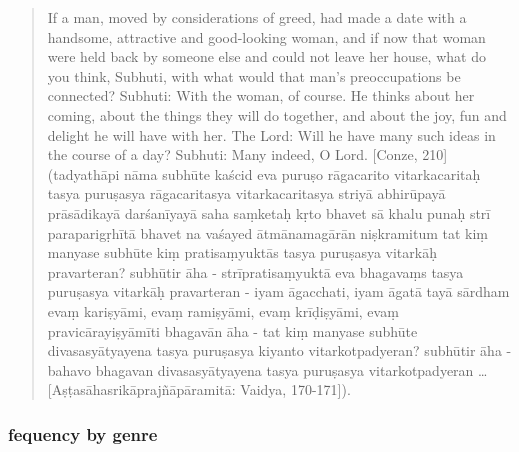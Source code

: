 \documentclass[
  letterpaper,
  DIV=11,
  numbers=noendperiod,
  oneside]{scrreprt}
\begin{document}
\begin{quote}
If a man, moved by considerations of greed, had made a date with a
handsome, attractive and good-looking woman, and if now that woman were
held back by someone else and could not leave her house, what do you
think, Subhuti, with what would that man's preoccupations be connected?
Subhuti: With the woman, of course. He thinks about her coming, about
the things they will do together, and about the joy, fun and delight he
will have with her. The Lord: Will he have many such ideas in the course
of a day? Subhuti: Many indeed, O Lord. {[}Conze, 210{]} (tadyathāpi
nāma subhūte kaścid eva puruṣo rāgacarito vitarkacaritaḥ \textbar{}
tasya puruṣasya rāgacaritasya vitarkacaritasya striyā abhirūpayā
prāsādikayā darśanīyayā saha saṃketaḥ kṛto bhavet \textbar{} sā khalu
punaḥ strī paraparigṛhītā bhavet \textbar{} na vaśayed ātmānamagārān
niṣkramitum \textbar{} tat kiṃ manyase subhūte kiṃ pratisaṃyuktās tasya
puruṣasya vitarkāḥ pravarteran? subhūtir āha - strīpratisaṃyuktā eva
bhagavaṃs tasya puruṣasya vitarkāḥ pravarteran - iyam āgacchati, iyam
āgatā \textbar{} tayā sārdham evaṃ kariṣyāmi, evaṃ ramiṣyāmi, evaṃ
krīḍiṣyāmi, evaṃ pravicārayiṣyāmīti \textbar{} bhagavān āha - tat kiṃ
manyase subhūte divasasyātyayena tasya puruṣasya kiyanto
vitarkotpadyeran? subhūtir āha - bahavo bhagavan divasasyātyayena tasya
puruṣasya vitarkotpadyeran \ldots{} {[}Aṣṭasāhasrikāprajñāpāramitā:
Vaidya, 170-171{]}).
\end{quote}

\hypertarget{fequency-by-genre}{%
\subsubsection{fequency by genre}\label{fequency-by-genre}}

\end{document}
